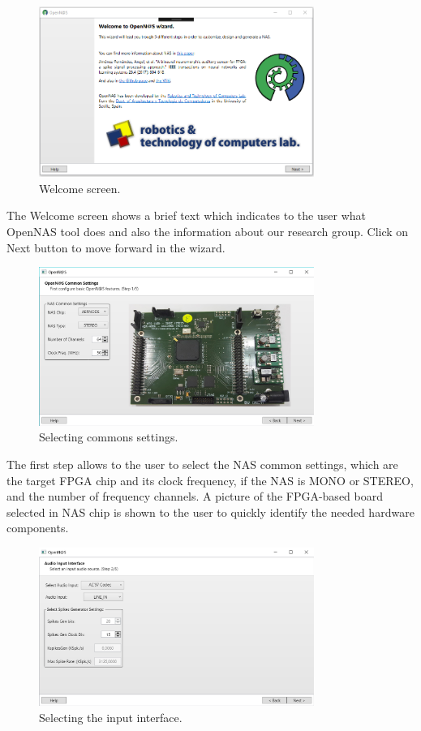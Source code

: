 \begin{figure}[H]
\centering
\includegraphics[width=0.8\textwidth]{images/Img13_VS_Init_App.PNG}
\caption{\label{fig:wizard_overview_welcome}Welcome screen.}
\end{figure}

The Welcome screen shows a brief text which indicates to the user what OpenNAS tool does and also the information about our research group. Click on Next button to move forward in the wizard. 

\begin{figure}[H]
\centering
\includegraphics[width=0.8\textwidth]{images/Img14_VS_Step1.PNG}
\caption{\label{fig:wizard_overview_s1}Selecting commons settings.}
\end{figure}

The first step allows to the user to select the NAS common settings, which are the target FPGA chip and its clock frequency, if the NAS is MONO or STEREO, and the number of frequency channels. A picture of the FPGA-based board selected in NAS chip is shown to the user to quickly identify the needed hardware components. 

\begin{figure}[H]
\centering
\includegraphics[width=0.8\textwidth]{images/Img16_S2_SelectInput.PNG}
\caption{\label{fig:wizard_overview_s2}Selecting the input interface.}
\end{figure}

